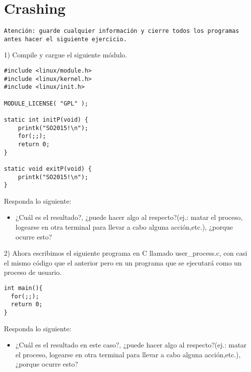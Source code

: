\section{Crashing}

\texttt{Atención: guarde cualquier información y cierre todos los programas antes hacer el siguiente ejercicio.}


1) Compile  y cargue el siguiente módulo.

\begin{verbatim}
#include <linux/module.h>
#include <linux/kernel.h>
#include <linux/init.h>

MODULE_LICENSE( "GPL" );

static int initP(void) {
    printk("SO2015!\n");
    for(;;);
    return 0;
}

static void exitP(void) {
    printk("SO2015!\n");
}
\end{verbatim}


Responda lo siguiente:
\begin{itemize}  
\item ¿Cuál es el resultado?, ¿puede hacer algo al respecto?(ej.: matar el proceso, logearse en otra terminal para llevar a cabo alguna acción,etc.),  ¿porque ocurre esto?
\end{itemize}  

2) Ahora escribimos el siguiente programa en C llamado user\_process.c, con casi el mismo código que el anterior pero en un programa que se ejecutará como un proceso de usuario.

\begin{verbatim}
int main(){
  for(;;);
  return 0;
}
\end{verbatim}

Responda lo siguiente:
\begin{itemize}  
\item ¿Cuál es el resultado en este caso?, ¿puede hacer algo al respecto?(ej.: matar el proceso, logearse en otra terminal para llevar a cabo alguna acción,etc.),  ¿porque ocurre esto? 
\end{itemize}  

